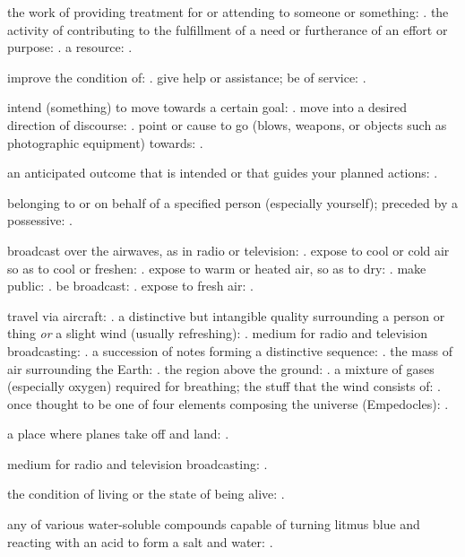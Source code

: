   the work of providing treatment for or attending to someone or something: . the activity of contributing to the fulfillment of a need or furtherance of an effort or purpose: . a resource: .

  improve the condition of: . give help or assistance; be of service: .

  intend (something) to move towards a certain goal: . move into a desired direction of discourse: . point or cause to go (blows, weapons, or objects such as photographic equipment) towards: .

  an anticipated outcome that is intended or that guides your planned actions: .

  belonging to or on behalf of a specified person (especially yourself); preceded by a possessive: .

  broadcast over the airwaves, as in radio or television: . expose to cool or cold air so as to cool or freshen: . expose to warm or heated air, so as to dry: . make public: . be broadcast: . expose to fresh air: .

  travel via aircraft: . a distinctive but intangible quality surrounding a person or thing \textit{or} a slight wind (usually refreshing): . medium for radio and television broadcasting: . a succession of notes forming a distinctive sequence: . the mass of air surrounding the Earth: . the region above the ground: . a mixture of gases (especially oxygen) required for breathing; the stuff that the wind consists of: . once thought to be one of four elements composing the universe (Empedocles): .

  a place where planes take off and land: .

  medium for radio and television broadcasting: .

  the condition of living or the state of being alive: .

  any of various water-soluble compounds capable of turning litmus blue and reacting with an acid to form a salt and water: .

